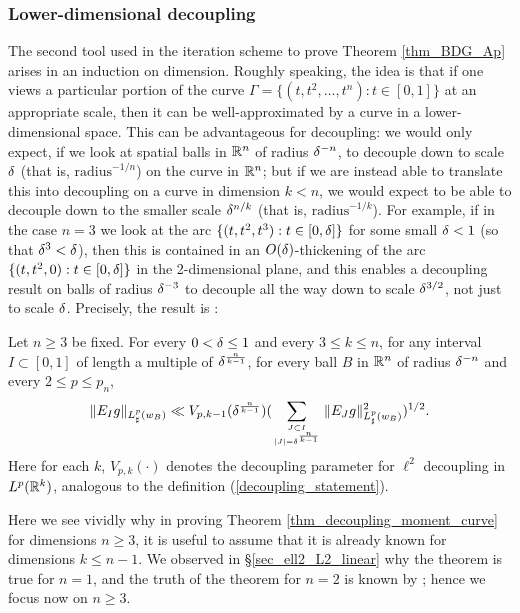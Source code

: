 \documentclass[brochure,english,12pt]{bourbaki}%
\begin{document}
\subsubsection{Lower-dimensional decoupling}
The second tool used in the iteration scheme to prove Theorem \ref{thm_BDG_Ap} arises in an induction on dimension.
Roughly speaking, the idea is that if one views a particular portion of the curve $\Gamma = \{ (t,t^2,\ldots, t^n): t \in [0,1]\}$ at an appropriate scale, then it can be well-approximated by a curve in a lower-dimensional space. This can be advantageous for decoupling: we would only expect, if we look at spatial balls in $\mathbb{R}^n$ of radius $\delta^{-n}$, to decouple down to scale $\delta$ (that is, $\mathrm{radius}^{-1/n}$) on the curve in $\mathbb{R}^n$; but if we are instead able to translate this into decoupling on a curve in dimension $k<n$, we would expect to be able to decouple down to the smaller scale $\delta^{n/k}$ (that is, $\mathrm{radius}^{-1/k}$).  For example, if in the case $n=3$ we look at the arc $\{ (t,t^2,t^3) : t \in [0,\delta]\}$ for some small $\delta<1$ (so that $\delta^3 < \delta$), then this is contained in an $O(\delta)$-thickening of the arc $\{ (t,t^2,0) : t \in [0,\delta]\}$ in the 2-dimensional plane, and this enables a decoupling result on balls of radius $\delta^{-3}$ to decouple all the way down to scale $\delta^{3/2}$, not just to scale $\delta$.
Precisely, the result is \cite[Lemma 8.2]{BDG16}:
\begin{prop}\label{prop_lower_dim_decoupling}
Let $n \geq 3$ be fixed. For every $0<\delta \leq 1$ and every $3 \leq k \leq n$, for any interval $I \subset [0,1]$ of length a multiple of $\delta^{\frac{n}{k-1}}$, for every ball $B$ in $\mathbb{R}^n$ of radius $\delta^{-n}$ and every $2\leq p \leq p_n$,
\[ \|E_I g\|_{L^p_\sharp(w_B)} \ll V_{p,k-1}(\delta^{\frac{n}{k-1}}) ( \sum_{J \subset I \atop |J| = \delta^{\frac{n}{k-1}}} \| E_J g\|_{L^p_\sharp(w_B)}^2)^{1/2}.\]
Here for each $k$, $V_{p,k}(\cdot)$ denotes the decoupling parameter for $\ell^2$ decoupling in $L^p(\mathbb{R}^k)$, analogous to the definition (\ref{decoupling_statement}).
\end{prop}
Here we see vividly why in proving Theorem \ref{thm_decoupling_moment_curve} for dimensions $n \geq 3$, it is useful to assume that it is already known for  dimensions $k \leq n-1$. We observed in \S \ref{sec_ell2_L2_linear} why the theorem is true for $n=1$, and the truth of the theorem for $n=2$ is known by \cite{BouDem15}; hence we focus now on $n \geq 3$.
\end{document}
